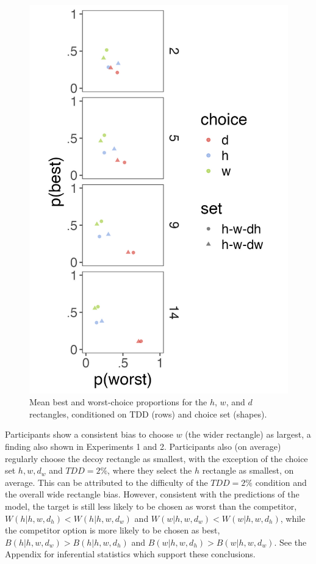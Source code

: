 \begin{figure}
   \includegraphics[width=\linewidth]{figures/crit_mean_choice_by_set_dist_labelHW.jpeg}
   \caption{Mean best and worst-choice proportions for the $h$, $w$, and $d$ rectangles, conditioned on TDD (rows) and choice set (shapes).}
   \label{fig:bw_mean_choice_by_set}
\end{figure}

Participants show a consistent bias to choose $w$ (the wider rectangle) as largest, a finding also shown in Experiments 1 and 2. Participants also (on average) regularly choose the decoy rectangle as smallest, with the exception of the choice set $h,w,d_{w}$ and $TDD=2\%$, where they select the $h$ rectangle as smallest, on average. This can be attributed to the difficulty of the $TDD=2\%$ condition and the overall wide rectangle bias. However, consistent with the predictions of the model, the target is still less likely to be chosen as worst than the competitor, $W(h|{h,w,d_{h}})<W(h|{h,w,d_{w}})$ and $W(w|{h,w,d_{w}})<W(w|{h,w,d_{h}})$, while the competitor option is more likely to be chosen as best, $B(h|{h,w,d_{w}})>B(h|{h,w,d_{h}})$ and $B(w|{h,w,d_{h}})>B(w|{h,w,d_{w}})$. See the Appendix for inferential statistics which support these conclusions.

